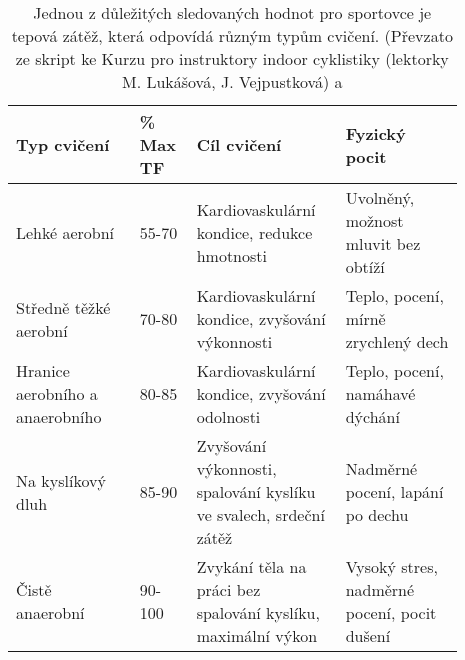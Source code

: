 \begin{table}[ht]
    \centering
    \begin{tabular}{p{0.25\linewidth} | p{0.1\linewidth} | p{0.30\linewidth} | p{0.24\linewidth}}
        \textbf{Typ cvičení}            & \textbf{\% Max TF} & \textbf{Cíl cvičení}                                              & \textbf{Fyzický pocit}              \\ \hline
        Lehké aerobní                   & 55-70                    & Kardiovaskulární kondice, redukce hmotnosti                       & Uvolněný, možnost mluvit bez obtíží \\
        Středně těžké aerobní           & 70-80                    & Kardiovaskulární kondice, zvyšování výkonnosti                    & Teplo, pocení, mírně zrychlený dech \\
        Hranice aerobního a anaerobního & 80-85                    & Kardiovaskulární kondice, zvyšování odolnosti                     & Teplo, pocení, namáhavé dýchání     \\
        Na kyslíkový dluh               & 85-90                    & Zvyšování výkonnosti, spalování kyslíku ve svalech, srdeční zátěž & Nadměrné pocení, lapání po dechu    \\
        Čistě anaerobní                 & 90-100                   & Zvykání těla na práci bez spalování kyslíku, maximální výkon      & Vysoký stres, nadměrné pocení, pocit dušení
    \end{tabular}
    \caption[Typy cvičení podle maximální tepové frekvence]{Jednou z důležitých sledovaných hodnot pro sportovce je tepová zátěž, která odpovídá různým typům cvičení. (Převzato ze skript ke Kurzu pro instruktory indoor cyklistiky (lektorky M. Lukášová, J. Vejpustková) a \cite{tep}}
    \label{tab:MTF}
\end{table}
